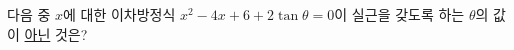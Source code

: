 다음 중 $x$에 대한 이차방정식 $x^{2}-4x+6+2\tan\theta=0$이 실근을 갖도록 하는 $\theta$의 값이 \underline{아닌} 것은? \dmcondfill{$0\le\theta<2\pi$}{}
